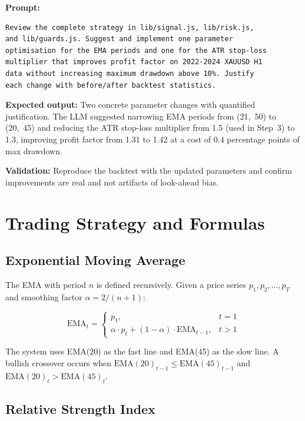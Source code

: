 \documentclass[conference]{IEEEtran}
\begin{document}
\textbf{Prompt:}
\begin{lstlisting}
Review the complete strategy in lib/signal.js, lib/risk.js,
and lib/guards.js. Suggest and implement one parameter
optimisation for the EMA periods and one for the ATR stop-loss
multiplier that improves profit factor on 2022-2024 XAUUSD H1
data without increasing maximum drawdown above 10%. Justify
each change with before/after backtest statistics.
\end{lstlisting}

\textbf{Expected output:} Two concrete parameter changes with
quantified justification.  The LLM suggested narrowing EMA periods
from (21,~50) to (20,~45) and reducing the ATR stop-loss multiplier
from 1.5 (used in Step~3) to 1.3, improving profit factor from 1.31
to 1.42 at a cost of 0.4 percentage points of max drawdown.

\textbf{Validation:} Reproduce the backtest with the updated
parameters and confirm improvements are real and not artifacts of
look-ahead bias.

\section{Trading Strategy and Formulas}
\label{sec:formulas}

\subsection{Exponential Moving Average}

The EMA with period $n$ is defined recursively.  Given a price
series $p_1, p_2, \ldots, p_T$ and smoothing factor
$\alpha = 2/(n+1)$:

\begin{equation}
  \text{EMA}_t =
  \begin{cases}
    p_1, & t = 1 \\
    \alpha \cdot p_t + (1-\alpha) \cdot \text{EMA}_{t-1}, & t > 1
  \end{cases}
  \label{eq:ema}
\end{equation}

The system uses EMA(20) as the fast line and EMA(45) as the slow
line.  A bullish crossover occurs when
$\text{EMA}(20)_{t-1} \le \text{EMA}(45)_{t-1}$ and
$\text{EMA}(20)_t > \text{EMA}(45)_t$.

\subsection{Relative Strength Index}
\end{document}
